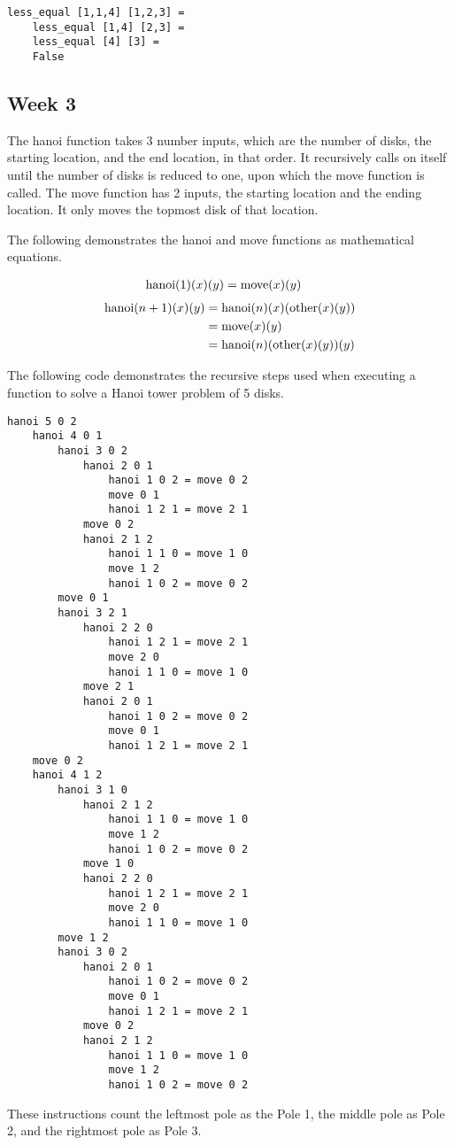 \documentclass{article}
\theoremstyle{theorem}
\theoremstyle{definition}
\theoremstyle{remark}
\begin{document}
\begin{lstlisting}
less_equal [1,1,4] [1,2,3] =
	less_equal [1,4] [2,3] =
	less_equal [4] [3] =
	False
\end{lstlisting}

\subsection{Week 3}

The hanoi function takes 3 number inputs, which are the number of disks, the starting location, and the end location, in that order. It recursively calls on itself until the number of disks is reduced to one, upon which the move function is called. The move function has 2 inputs, the starting location and the ending location. It only moves the topmost disk of that location.

\medskip\noindent
The following demonstrates the hanoi and move functions as mathematical equations.

\begin{align*}
{\rm hanoi} (1) (x) (y)
& = {\rm move}(x)(y)
\end{align*}
\begin{align*}
{\rm hanoi} (n+1) (x) (y)
& = {\rm hanoi} (n) (x) ({\rm other}(x)(y)) \\
& = {\rm move}(x)(y)\\
& = {\rm hanoi} (n) ({\rm other}(x)(y)) (y)
\end{align*}

\medskip\noindent
The following code demonstrates the recursive steps used when executing a function to solve a Hanoi tower problem of 5 disks.

\begin{lstlisting}
hanoi 5 0 2
	hanoi 4 0 1
		hanoi 3 0 2
			hanoi 2 0 1
				hanoi 1 0 2 = move 0 2
				move 0 1
				hanoi 1 2 1 = move 2 1
			move 0 2
			hanoi 2 1 2
				hanoi 1 1 0 = move 1 0
				move 1 2
				hanoi 1 0 2 = move 0 2
		move 0 1
		hanoi 3 2 1
			hanoi 2 2 0
				hanoi 1 2 1 = move 2 1
				move 2 0
				hanoi 1 1 0 = move 1 0
			move 2 1
			hanoi 2 0 1
				hanoi 1 0 2 = move 0 2
				move 0 1
				hanoi 1 2 1 = move 2 1
	move 0 2
	hanoi 4 1 2
		hanoi 3 1 0
			hanoi 2 1 2
				hanoi 1 1 0 = move 1 0
				move 1 2
				hanoi 1 0 2 = move 0 2
			move 1 0
			hanoi 2 2 0
				hanoi 1 2 1 = move 2 1
				move 2 0
				hanoi 1 1 0 = move 1 0
		move 1 2
		hanoi 3 0 2
			hanoi 2 0 1
				hanoi 1 0 2 = move 0 2
				move 0 1
				hanoi 1 2 1 = move 2 1
			move 0 2
			hanoi 2 1 2
				hanoi 1 1 0 = move 1 0
				move 1 2
				hanoi 1 0 2 = move 0 2
\end{lstlisting}
%
These instructions count the leftmost pole as the Pole 1, the middle pole as Pole 2, and the rightmost pole as Pole 3.
\end{document}
